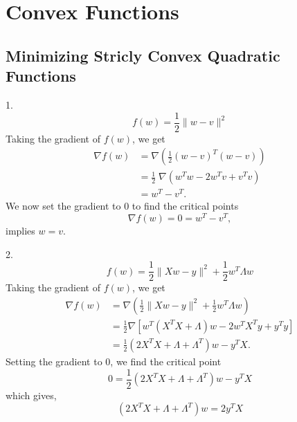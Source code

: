 \section{Convex Functions}
\subsection{Minimizing Stricly Convex Quadratic Functions}
1. \begin{equation}
f(w) = \frac{1}{2}\parallel w - v\parallel^{2}
\end{equation}
Taking the gradient of $f(w)$, we get
\begin{align}
\nabla f(w) &= \nabla \left(\frac{1}{2}(w-v)^{T}(w-v)\right)\\
&=\frac{1}{2}\;\nabla\left(w^{T}w-2w^{T}v +v^{T}v\right)\nonumber\\
&=w^{T}-v^{T}.\nonumber
\end{align}
We now set the gradient to 0 to find the critical points
\begin{equation}
\nabla f(w) = 0 = w^{T} - v^{T},
\end{equation}
implies $w = v$.

2. \begin{equation}
f(w) = \frac{1}{2}\parallel Xw - y\parallel^{2}+\frac{1}{2}w^{T}\Lambda w
\end{equation}
Taking the gradient of $f(w)$, we get
\begin{align}
\nabla f(w) &= \nabla \left(\frac{1}{2}\parallel Xw - y\parallel^{2}+\frac{1}{2}w^{T}\Lambda w\right)\\
&=\frac{1}{2}\nabla \left[w^{T}\left(X^{T}X+\Lambda\right)w-2w^{T}X^{T}y+y^{T}y\right]\nonumber\\
&=\frac{1}{2}\left(2X^{T}X+\Lambda+\Lambda^{T}\right)w-y^{T}X\nonumber.
\end{align}
Setting the gradient to 0, we find the critical point
\begin{equation}
0 = \frac{1}{2}\left(2X^{T}X+\Lambda+\Lambda^{T}\right)w-y^{T}X
\end{equation}
which gives,
\begin{equation}
\left(2X^{T}X+\Lambda+\Lambda^{T}\right)w = 2y^{T}X 
\end{equation}